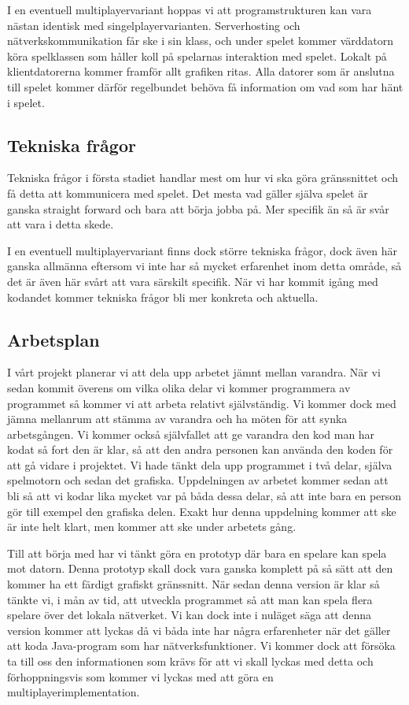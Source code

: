 \documentclass[10pt,twoside,a4paper]{article}
\begin{document}
I en eventuell multiplayervariant hoppas vi att programstrukturen kan vara
nästan identisk med singelplayervarianten. Serverhosting och
nätverkskommunikation får ske i sin klass, och under spelet kommer
värddatorn köra spelklassen som håller koll på spelarnas interaktion med
spelet. Lokalt på klientdatorerna kommer framför allt grafiken ritas. Alla
datorer som är anslutna till spelet kommer därför regelbundet behöva få
information om vad som har hänt i spelet.

\subsection*{Tekniska frågor}

Tekniska frågor i första stadiet handlar mest om hur vi ska göra
gränssnittet och få detta att kommunicera med spelet. Det mesta vad gäller
själva spelet är ganska straight forward och bara att börja jobba på. Mer
specifik än så är svår att vara i detta skede.

I en eventuell multiplayervariant finns dock större tekniska frågor, dock
även här ganska allmänna eftersom vi inte har så mycket erfarenhet inom
detta område, så det är även här svårt att vara särskilt specifik. När vi
har kommit igång med kodandet kommer tekniska frågor bli mer konkreta och
aktuella.

\subsection*{Arbetsplan}

I vårt projekt planerar vi att dela upp arbetet jämnt mellan varandra. När
vi sedan kommit överens om vilka olika delar vi kommer programmera av
programmet så kommer vi att arbeta relativt självständig. Vi kommer dock
med jämna mellanrum att stämma av varandra och ha möten för att synka
arbetsgången. Vi kommer också självfallet att ge varandra den kod man har
kodat så fort den är klar, så att den andra personen kan använda den koden
för att gå vidare i projektet. Vi hade tänkt dela upp programmet i två
delar, själva spelmotorn och sedan det grafiska. Uppdelningen av arbetet
kommer sedan att bli så att vi kodar lika mycket var på båda dessa delar,
så att inte bara en person gör till exempel den grafiska delen. Exakt hur
denna uppdelning kommer att ske är inte helt klart, men kommer att ske
under arbetets gång.

Till att börja med har vi tänkt göra en prototyp där bara en spelare kan
spela mot datorn. Denna prototyp skall dock vara ganska komplett på så sätt
att den kommer ha ett färdigt grafiskt gränssnitt. När sedan denna version
är klar så tänkte vi, i mån av tid, att utveckla programmet så att man kan
spela flera spelare över det lokala nätverket. Vi kan dock inte i nuläget
säga att denna version kommer att lyckas då vi båda inte har några
erfarenheter när det gäller att koda Java-program som har
nätverksfunktioner. Vi kommer dock att försöka ta till oss den
informationen som krävs för att vi skall lyckas med detta och
förhoppningsvis som kommer vi lyckas med att göra en
multiplayerimplementation.
\end{document}
